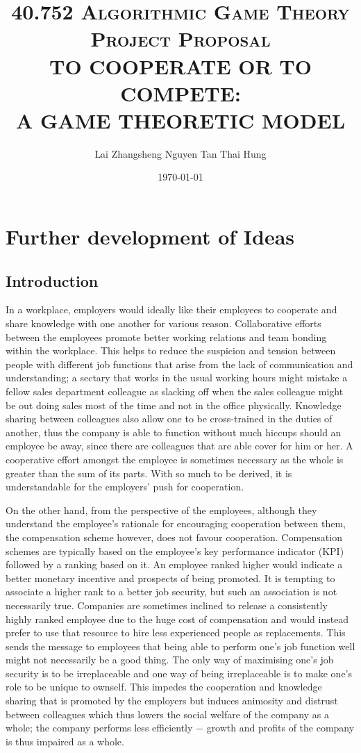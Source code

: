 \documentclass[10pt, a4paper]{article}
\title{
	\vspace*{-1.5cm}
	\scshape 40.752 Algorithmic Game Theory\\
	\vspace{0.5cm}
	Project Proposal\\
	\vspace{0.5cm}
	{\bfseries\Large TO COOPERATE OR TO COMPETE: \\
		A GAME THEORETIC MODEL}\\
	\vspace{0.5cm}}
\author{Lai Zhangsheng \qquad \qquad Nguyen Tan Thai Hung}
\date{\today}
\begin{document}
	
	\maketitle
	
	\section{Further development of Ideas}
	\subsection{Introduction}
	In a workplace, employers would ideally like their employees to cooperate and share knowledge with one another for various reason. Collaborative efforts between the employees promote better working relations and team bonding within the workplace. This helps to reduce the suspicion and tension between people with different job functions that arise from the lack of communication and understanding; a sectary that works in the usual working hours might mistake a fellow sales department colleague as slacking off when the sales colleague might be out doing sales most of the time and not in the office physically. Knowledge sharing between colleagues also allow one to be cross-trained in the duties of another, thus the company is able to function without much hiccups should an employee be away, since there are colleagues that are able cover for him or her. A cooperative effort amongst the employee is sometimes necessary as the whole is greater than the sum of its parts. With so much to be derived, it is understandable for the employers' push for cooperation.
	
	On the other hand, from the perspective of the employees, although they understand the employee's rationale for encouraging cooperation between them, the compensation scheme however, does not favour cooperation. Compensation schemes are typically based on the employee's key performance indicator (KPI) followed by a ranking based on it. An employee ranked higher would indicate a better monetary incentive and prospects of being promoted. It is tempting to associate a higher rank to a better job security, but such an association is not necessarily true. Companies are sometimes inclined to release a consistently highly ranked employee due to the huge cost of compensation and would instead prefer to use that resource to hire less experienced people as replacements. This sends the message to employees that being able to perform one's job function well might not necessarily be a good thing. The only way of maximising one's job security is to be irreplaceable and one way of being irreplaceable is to make one's role to be unique to ownself. This impedes the cooperation and knowledge sharing that is promoted by the employers but induces animosity and distrust between colleagues which thus lowers the social welfare of the company as a whole; the company performs less efficiently $-$ growth and profits of the company is thus impaired as a whole.
	
\end{document}
